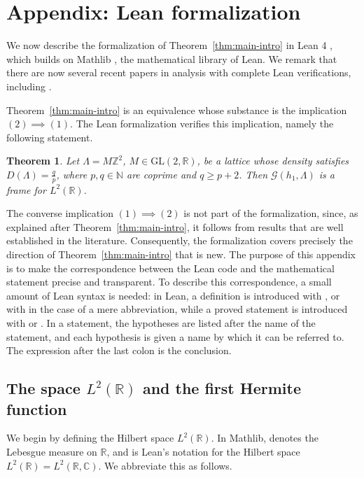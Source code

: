 \documentclass[reqno,a4paper,12pt]{amsart}
\numberwithin{equation}{section}
\newtheorem*{theorem*}{Theorem}
\newcommand{\N}{\mathbb N}
\newcommand{\Z}{\mathbb Z}
\newcommand{\R}{\mathbb R}
\newcommand{\C}{\mathbb C}
\newcommand{\calG}{\mathcal G}
\begin{document}
\section{Appendix: Lean formalization}\label{sec:lean}

We now describe the formalization of Theorem~\ref{thm:main-intro} in Lean 4 \cite{Moura2021Lean4}, which builds on Mathlib \cite{mathlib2020}, the mathematical library of Lean.  We remark that there are now several recent papers in analysis with complete Lean verifications, including  \cite{armstrong2026formalization, pont2026cantor,hariharan2026milestone,ilin2026semi, liehr2026grothendieck,miller2026formalization}. 

Theorem~\ref{thm:main-intro} is an equivalence whose substance is the implication $(2)\implies(1)$. The Lean formalization verifies this implication, namely the following statement.

\begin{theorem*}
Let $\Lambda=M\Z^2$, $M\in\mathrm{GL}(2,\R)$, be a lattice whose density satisfies $D(\Lambda)=\frac qp$, where $p,q\in\N$ are coprime and $q\geq p+2$. Then $\calG(h_1,\Lambda)$ is a frame for $L^2(\R)$.
\end{theorem*}

The converse implication $(1)\implies(2)$ is not part of the formalization, since, as explained after Theorem~\ref{thm:main-intro}, it follows from results that are well established in the literature. Consequently, the formalization covers precisely the direction of Theorem~\ref{thm:main-intro} that is new. The purpose of this appendix is to make the correspondence between the Lean code and the mathematical statement precise and transparent. To describe this correspondence, a small amount of Lean syntax is needed: in Lean, a definition is introduced with , or with  in the case of a mere abbreviation, while a proved statement is introduced with  or . In a statement, the hypotheses are listed after the name of the statement, and each hypothesis is given a name by which it can be referred to. The expression after the last colon is the conclusion.

\subsection{The space $L^2(\R)$ and the first Hermite function}

We begin by defining the Hilbert space $L^2(\R)$. In Mathlib,  denotes the Lebesgue measure on $\R$, and  is Lean's notation for the Hilbert space $L^2(\R)=L^2(\R,\C)$. We abbreviate this as follows.
\end{document}

